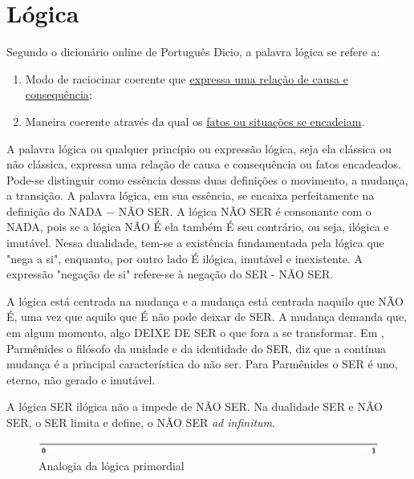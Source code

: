 \section{Lógica}
Segundo o dicionário online de Português Dicio\cite{dicio_logica}, a palavra lógica se refere a:
	\begin{enumerate}
	   \item Modo de raciocinar coerente que \underline{expressa uma relação de causa e consequência};
	   \item Maneira coerente através da qual os \underline{fatos ou situações se encadeiam}. 
	\end{enumerate}
 
\bigbreak
A palavra lógica ou qualquer princípio ou expressão lógica, seja ela clássica ou não clássica, expressa uma relação de causa e consequência ou fatos encadeados. Pode-se distinguir como essência dessas duas definições o movimento, a mudança, a transição. A palavra lógica, em sua essência, se encaixa perfeitamente na definição do NADA − NÃO SER.  A lógica NÃO SER é consonante com o NADA, pois se a lógica NÃO É ela também É seu contrário, ou seja, ilógica e imutável. Nessa dualidade, tem-se a existência fundamentada pela lógica que "nega a si", enquanto, por outro lado É ilógica, imutável e inexistente. A expressão "negação de si" refere-se à negação do SER - NÃO SER. 

A lógica está centrada na mudança e a mudança está centrada naquilo que NÃO É, uma vez que aquilo que É não pode deixar de SER. A mudança demanda que, em algum momento, algo DEIXE DE SER o que fora a se transformar. Em , Parmênides  o filósofo da unidade e da identidade do SER, diz que a contínua mudança é a principal característica do não ser. Para Parmênides o SER é uno, eterno, não gerado e imutável.

A lógica SER ilógica não a impede de NÃO SER. Na dualidade SER e NÃO SER, o SER limita e define, o NÃO SER \textit{ad infinitum}.
	\begin{figure}[H]
	\caption{Analogia da lógica primordial}
	\label{fig:primordial_logic_representation}
	\centering
	\includegraphics[scale=1]{sections/images/primordial_logic_representation.jpg}
	\end{figure}


